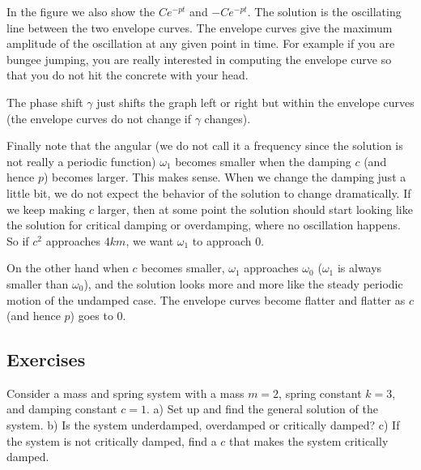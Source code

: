 
In the figure
we also show the \emph{}
$C e^{-pt}$ and $-C e^{-pt}$.  The solution
is the oscillating line between the two envelope curves.
The envelope curves give
the maximum amplitude of the oscillation at any given point in time.  For
example if you are bungee jumping, you are really interested in computing the
envelope curve so that you do not hit the concrete with your head.

The phase shift $\gamma$ just shifts the graph left or right but within the
envelope curves (the envelope curves do not change if $\gamma$
changes).

Finally note that the angular \emph{}
(we do not call it a frequency
since the solution is not really a periodic function) $\omega_1$ becomes
smaller when the damping $c$ (and hence $p$) becomes larger.  This makes sense.
When we change the damping just a little bit, we do not
expect the behavior of the solution to change dramatically.
If we keep making $c$ larger, then
at some point the solution should start looking 
like the solution for critical damping or overdamping, where no oscillation
happens.  So if $c^2$ approaches $4km$, we want $\omega_1$ to approach 0.

On the other hand when $c$ becomes smaller, $\omega_1$ approaches $\omega_0$
($\omega_1$ is always smaller than $\omega_0$), and the solution looks more and more like the steady
periodic motion of the undamped case.  The envelope curves become flatter and
flatter as $c$ (and hence $p$) goes to 0.

\subsection{Exercises}

\begin{exercise} \label{mv:ex1}
Consider a mass and spring system with a mass $m=2$, spring constant $k=3$, and
damping constant $c=1$.
a) Set up and find the general solution of the system.
b) Is the system underdamped, overdamped or critically damped?
c) If the system is not critically damped, find a $c$ that makes the system
critically damped.
\end{exercise}

